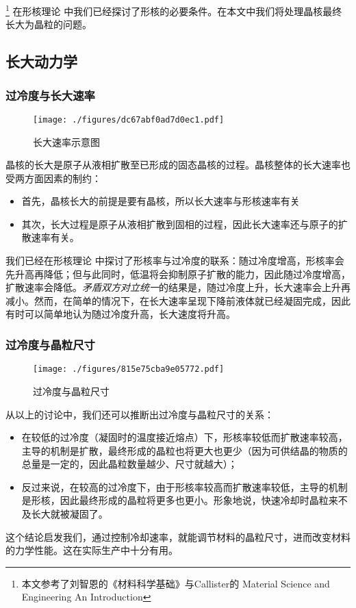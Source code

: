 
\footnote{本文参考了刘智恩的《材料科学基础》与Callister的 Material Science and Engineering An Introduction} 在形核理论  中我们已经探讨了形核的必要条件。在本文中我们将处理晶核最终长大为晶粒的问题。

\subsection{长大动力学}
\subsubsection{过冷度与长大速率}
\begin{figure}[ht]
\centering
\texttt{[image: ./figures/dc67abf0ad7d0ec1.pdf]}
\caption{长大速率示意图} \label{fig_GGRW_1}
\end{figure}

晶核的长大是原子从液相扩散至已形成的固态晶核的过程。晶核整体的长大速率也受两方面因素的制约：
\begin{itemize}
\item 首先，晶核长大的前提是要有晶核，所以长大速率与形核速率有关
\item 其次，长大过程是原子从液相扩散到固相的过程，因此长大速率还与原子的扩散速率有关。
\end{itemize}

我们已经在形核理论  中探讨了形核率与过冷度的联系：随过冷度增高，形核率会先升高再降低；但与此同时，低温将会抑制原子扩散的能力，因此随过冷度增高，扩散速率会降低。\textsl{矛盾双方对立统一}的结果是，随过冷度上升，长大速率会上升再减小。然而，在简单的情况下，在长大速率呈现下降前液体就已经凝固完成，因此有时可以简单地认为随过冷度升高，长大速度将升高。

\subsubsection{过冷度与晶粒尺寸}
\begin{figure}[ht]
\centering
\texttt{[image: ./figures/815e75cba9e05772.pdf]}
\caption{过冷度与晶粒尺寸} \label{fig_GGRW_2}
\end{figure}
从以上的讨论中，我们还可以推断出过冷度与晶粒尺寸的关系：
\begin{itemize}
\item 在较低的过冷度（凝固时的温度接近熔点）下，形核率较低而扩散速率较高，主导的机制是扩散，最终形成的晶粒也将更大也更少（因为可供结晶的物质的总量是一定的，因此晶粒数量越少、尺寸就越大）；
\item 反过来说，在较高的过冷度下，由于形核率较高而扩散速率较低，主导的机制是形核，因此最终形成的晶粒将更多也更小。形象地说，快速冷却时晶粒来不及长大就被凝固了。
\end{itemize}
这个结论启发我们，通过控制冷却速率，就能调节材料的晶粒尺寸，进而改变材料的力学性能。这在实际生产中十分有用。


